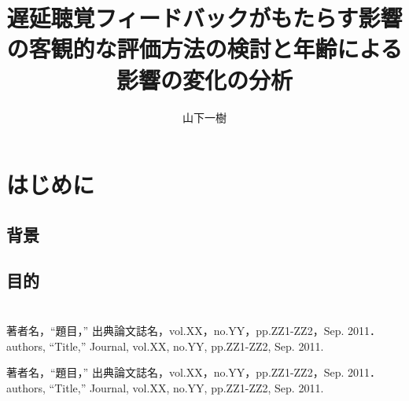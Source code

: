 \documentclass[twocolumn]{jsarticle}
\title{遅延聴覚フィードバックがもたらす影響の客観的な評価方法の検討と年齢による影響の変化の分析}
\author{山下\hspace{1zw}一樹}
\begin{document}
\maketitle

\section{はじめに}
\subsection{背景}

\subsection{目的}

\section{}
\begin{thebibliography}{99}
	著者名，``題目，\<'' 出典論文誌名，vol.XX，no.YY，pp.ZZ1-ZZ2，Sep. 2011．
	authors, ``Title,'' Journal, vol.XX, no.YY, pp.ZZ1-ZZ2, Sep. 2011.
\end{thebibliography}

\begin{thepublished}{99}
	著者名，``題目，\<'' 出典論文誌名，vol.XX，no.YY，pp.ZZ1-ZZ2，Sep. 2011．
	authors, ``Title,'' Journal, vol.XX, no.YY, pp.ZZ1-ZZ2, Sep. 2011.
\end{thepublished}
\end{document}
